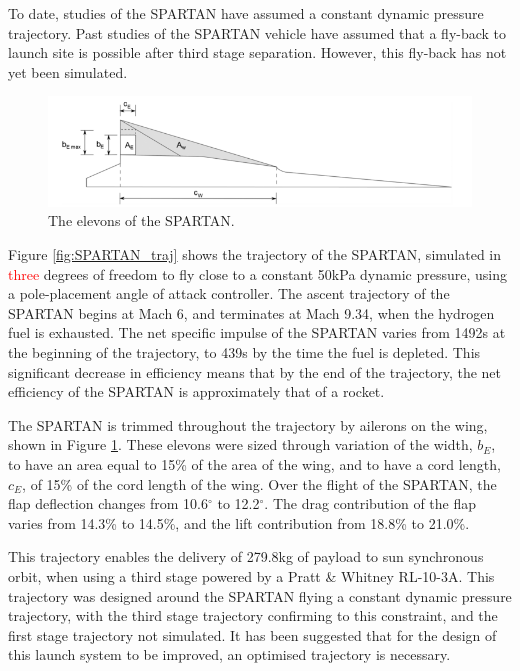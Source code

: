 To date, studies of the SPARTAN have assumed a constant dynamic pressure trajectory\cite{Preller2017b}.
Past studies of the SPARTAN vehicle have assumed that a fly-back to launch site is possible after third stage separation\cite{Preller2017b}. However, this fly-back has not yet been simulated. 
\begin{figure}[ht]
	\centering
	\includegraphics[width=0.7\linewidth]{figures/2_literature-review/SPARTANElevons}
	\caption{The elevons of the SPARTAN\cite{Preller2017b}.}
	\label{fig:SPARTANElevons}
\end{figure}

Figure \ref{fig:SPARTAN_traj} shows the trajectory of the SPARTAN, simulated in \textcolor{red}{three} degrees of freedom to fly close to a constant 50kPa dynamic pressure, using a pole-placement angle of attack controller\cite{Preller2017b}.
The ascent trajectory of the SPARTAN begins at Mach 6, and terminates at Mach 9.34, when the hydrogen fuel is exhausted\cite{Preller2017b}. 
The net specific impulse of the SPARTAN varies from 1492s at the beginning of the trajectory, to 439s by the time the fuel is depleted\cite{Preller2017b}. This significant decrease in efficiency means that by the end of the trajectory, the net efficiency of the SPARTAN is approximately that of a rocket\cite{Preller2017b}.

The SPARTAN is trimmed throughout the trajectory by ailerons on the wing, shown in Figure \ref{fig:SPARTANElevons}. These elevons were sized through variation of the width, $b_E$, to have an area equal to 15\% of the area of the wing, and to have a cord length, $c_E$, of 15\% of the cord length of the wing\cite{Preller2017b}. Over the flight of the SPARTAN, the flap deflection changes from 10.6$^\circ$ to 12.2$^\circ$\cite{Preller2017b}. The drag contribution of the flap varies from 14.3\% to 14.5\%, and the lift contribution from 18.8\% to 21.0\%\cite{Preller2018a}. 



This trajectory enables the delivery of 279.8kg of payload to sun synchronous orbit, when using a third stage powered by a Pratt \& Whitney RL-10-3A\cite{Preller2018a}. 
This trajectory was designed around the SPARTAN flying a constant dynamic pressure trajectory, with the third stage trajectory confirming to this constraint, and the first stage trajectory not simulated. It has been suggested that for the design of this launch system to be improved, an optimised trajectory is necessary\cite{Preller2017b}.








